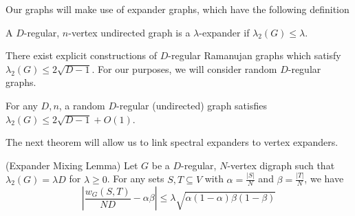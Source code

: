 Our graphs will make use of expander graphs, which have the following definition
\begin{defn}
A $D$-regular, $n$-vertex undirected graph is a $\lambda$-expander if $\lambda_2(G) \leq \lambda$.
\end{defn}
There exist explicit constructions of $D$-regular Ramanujan graphs which satisfy $\lambda_2(G) \leq 2\sqrt{D-1}$. For our purposes, we will consider random $D$-regular graphs.
\begin{thm}
For any $D,n$, a random $D$-regular (undirected) graph satisfies $\lambda_2(G) \leq 2\sqrt{D-1} + O(1)$.
\end{thm}

The next theorem will allow us to link spectral expanders to vertex expanders.

\begin{thm} (Expander Mixing Lemma)
Let $G$ be a $D$-regular, $N$-vertex digraph such that $\lambda_2(G) = \lambda D$ for $\lambda \geq 0$. For any sets $S,T \subseteq V$ with $\alpha = \frac{|S|}{N}$ and $\beta = \frac{|T|}{N}$, we have
\[
    \left|\frac{w_G(S,T)}{ND} - \alpha \beta\right| \leq \lambda \sqrt{\alpha (1-\alpha)\beta(1-\beta)}
\]
\end{thm}

